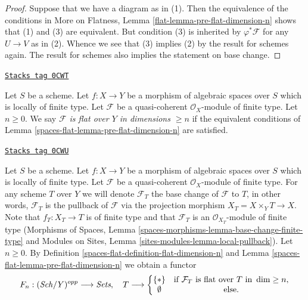 \begin{proof}
Suppose that we have a diagram as in (1). Then the equivalence of
the conditions in More on Flatness, Lemma \ref{flat-lemma-pre-flat-dimension-n}
shows that (1) and (3) are equivalent. But condition (3) is inherited
by $\varphi^*\mathcal{F}$ for any $U \to V$ as in (2).
Whence we see that (3) implies (2) by the result for schemes again.
The result for schemes also implies the statement on base change.
\end{proof}

\begin{definition}
\label{spaces-flat-definition-flat-dimension-n}
\href{https://stacks.math.columbia.edu/tag/0CWT}{\texttt{Stacks tag 0CWT}}

Let $S$ be a scheme. Let $f : X \to Y$ be a morphism of algebraic spaces
over $S$ which is locally of finite type.
Let $\mathcal{F}$ be a quasi-coherent $\mathcal{O}_X$-module of finite type.
Let $n \geq 0$.
We say {\it $\mathcal{F}$ is flat over $Y$ in dimensions $\geq n$}
if the equivalent conditions of Lemma \ref{spaces-flat-lemma-pre-flat-dimension-n}
are satisfied.
\end{definition}

\begin{definition}
\label{spaces-flat-situation-flat-dimension-n}
\href{https://stacks.math.columbia.edu/tag/0CWU}{\texttt{Stacks tag 0CWU}}

Let $S$ be a scheme. Let $f : X \to Y$ be a morphism of algebraic spaces
over $S$ which is locally of finite type. Let $\mathcal{F}$ be a quasi-coherent
$\mathcal{O}_X$-module of finite type. For any scheme $T$ over $Y$ we will
denote $\mathcal{F}_T$ the base change of $\mathcal{F}$ to $T$, in other words,
$\mathcal{F}_T$ is the pullback of $\mathcal{F}$ via the projection morphism
$X_T = X \times_Y T \to X$. Note that $f_T : X_T \to T$ is of finite type
and that $\mathcal{F}_T$ is an $\mathcal{O}_{X_T}$-module of finite type
(Morphisms of Spaces, Lemma
\ref{spaces-morphisms-lemma-base-change-finite-type}
and
Modules on Sites, Lemma \ref{sites-modules-lemma-local-pullback}).
Let $n \geq 0$. By Definition \ref{spaces-flat-definition-flat-dimension-n} and
Lemma \ref{spaces-flat-lemma-pre-flat-dimension-n} we obtain a functor
\begin{equation}
\label{equation-flat-dimension-n}
F_n : (\mathit{Sch}/Y)^{opp} \longrightarrow \textit{Sets}, \quad
T \longrightarrow \left\{
\begin{matrix}
\{*\} & \text{if }\mathcal{F}_T\text{ is flat over }T\text{ in }\dim \geq n, \\
\emptyset & \text{else.}
\end{matrix}
\right.
\end{equation}
\end{definition}


